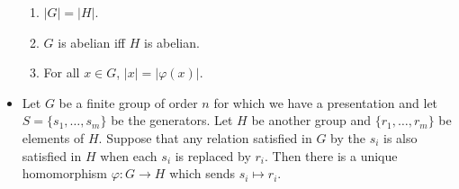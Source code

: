 \documentclass[../main.tex]{subfiles}
\begin{document}
\begin{itemize}
    \begin{enumerate}
        \item $|G|=|H|$.
        \item $G$ is abelian iff $H$ is abelian.
        \item For all $x\in G$, $|x|=|\varphi(x)|$.
    \end{enumerate}
    \item Let $G$ be a finite group of order $n$ for which we have a presentation and let $S=\{s_1,\dots,s_m\}$ be the generators. Let $H$ be another group and $\{r_1,\dots,r_m\}$ be elements of $H$. Suppose that any relation satisfied in $G$ by the $s_i$ is also satisfied in $H$ when each $s_i$ is replaced by $r_i$. Then there is a unique homomorphism $\varphi:G\to H$ which sends $s_i\mapsto r_i$.
\end{itemize}
\end{document}
